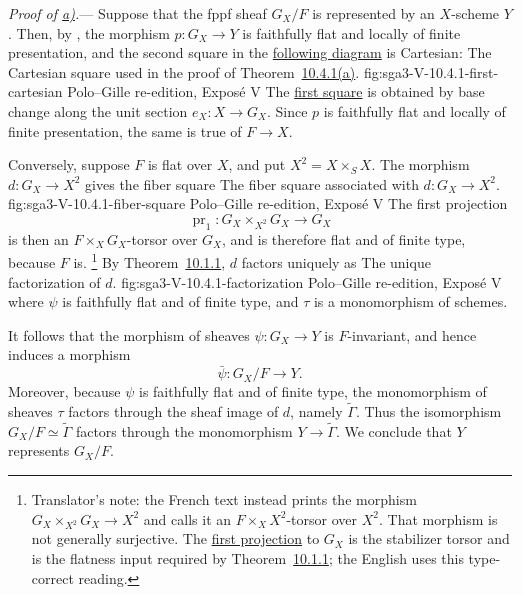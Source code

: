 
\medskip
{}\label{proof:sga3-V-10.4.1-a}%
\noindent\textit{Proof of \hyperref[thm:sga3-V-10.4.1-a]{a)}.}---
Suppose that the fppf sheaf \(G_X/F\) is represented by an \(X\)-scheme
\(Y\). Then, by , the morphism
\(p:G_X\to Y\) is faithfully flat and locally of finite presentation,
and the second square in the \hyperref[fig:sga3-V-10.4.1-first-cartesian]{following diagram} is Cartesian:
  {The Cartesian square used in the proof of
   Theorem~\hyperref[thm:sga3-V-10.4.1-a]{10.4.1(a)}.}
  {fig:sga3-V-10.4.1-first-cartesian}
  {Polo--Gille re-edition, Expos\'e V}
The \hyperref[fig:sga3-V-10.4.1-first-cartesian]{first square} is obtained by base change along the unit section
\(e_X:X\to G_X\). Since \(p\) is faithfully flat and locally of
finite presentation, the same is true of \(F\to X\).

Conversely, suppose \(F\) is flat over \(X\), and put
\(X^2=X\times_SX\). The morphism \(d:G_X\to X^2\) gives the fiber
square
  {The fiber square associated with \(d:G_X\to X^2\).}
  {fig:sga3-V-10.4.1-fiber-square}
  {Polo--Gille re-edition, Expos\'e V}
\label{eq:sga3-V-10.4.1-pr1-torsor}%
The first projection
\[
  \operatorname{pr}_1:G_X\times_{X^2}G_X\longrightarrow G_X
\]
is then an \(F\times_XG_X\)-torsor over \(G_X\), and is therefore flat
and of finite type, because \(F\) is.%
\footnote{\label{source-note:sga3-V-10.4.1-pr1-torsor}Translator's note: the French text instead prints the morphism
\(G_X\times_{X^2}G_X\to X^2\) and calls it an
\(F\times_XX^2\)-torsor over \(X^2\). That morphism is not generally
surjective. The \hyperref[eq:sga3-V-10.4.1-pr1-torsor]{first projection} to \(G_X\) is the stabilizer torsor
and is the flatness input required by Theorem~\hyperref[thm:sga3-V-10.1.1]{10.1.1}; the English uses
this type-correct reading.}
By
Theorem~\hyperref[thm:sga3-V-10.1.1]{10.1.1}, \(d\) factors uniquely
as
  {The unique factorization of \(d\).}
  {fig:sga3-V-10.4.1-factorization}
  {Polo--Gille re-edition, Expos\'e V}
where \(\psi\) is faithfully flat and of finite type, and \(\tau\) is
a monomorphism of schemes.

It follows that the morphism of sheaves \(\psi:G_X\to Y\) is
\(F\)-invariant, and hence induces a morphism
\[
  \bar\psi:G_X/F\longrightarrow Y.
\]
Moreover, because \(\psi\) is faithfully flat and of finite type, the
monomorphism of sheaves \(\tau\) factors through the sheaf image of
\(d\), namely \(\widetilde\Gamma\). Thus the isomorphism
\(G_X/F\simeq\widetilde\Gamma\) factors through the monomorphism
\(Y\to\widetilde\Gamma\). We conclude that \(Y\) represents \(G_X/F\).

